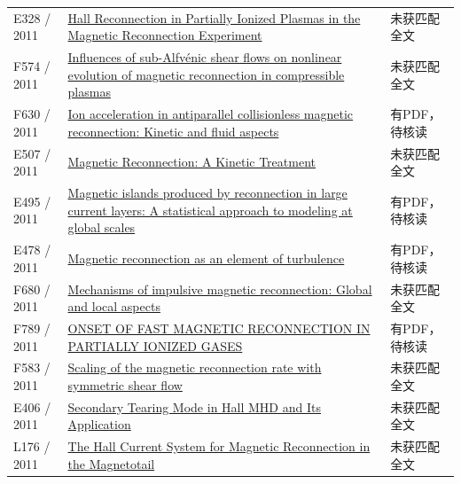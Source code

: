 \begin{longtable}{P{24mm}P{97mm}P{27mm}}
E328 / 2011 & \href{http://ui.adsabs.harvard.edu/abs/2012decs.confE...2L/abstract}{Hall Reconnection in Partially Ionized Plasmas in the Magnetic Reconnection Experiment} & 未获匹配全文\\

F574 / 2011 & \href{https://doi.org/10.1063/1.3643792}{Influences of sub-Alfvénic shear flows on nonlinear evolution of magnetic reconnection in compressible plasmas} & 未获匹配全文\\

F630 / 2011 & \href{https://doi.org/10.1016/j.crhy.2010.11.004}{Ion acceleration in antiparallel collisionless magnetic reconnection: Kinetic and fluid aspects} & 有PDF，待核读\\

E507 / 2011 & \href{https://doi.org/10.1029/gm090p0155}{Magnetic Reconnection: A Kinetic Treatment} & 未获匹配全文\\

E495 / 2011 & \href{http://hdl.handle.net/1903/12005}{Magnetic islands produced by reconnection in large current layers: A statistical approach to modeling at global scales} & 有PDF，待核读\\

E478 / 2011 & \href{https://doi.org/10.5194/npg-18-675-2011}{Magnetic reconnection as an element of turbulence} & 有PDF，待核读\\

F680 / 2011 & \href{https://doi.org/10.1063/1.3658034}{Mechanisms of impulsive magnetic reconnection: Global and local aspects} & 未获匹配全文\\

F789 / 2011 & \href{https://doi.org/10.1088/0004-637x/739/2/72}{ONSET OF FAST MAGNETIC RECONNECTION IN PARTIALLY IONIZED GASES} & 有PDF，待核读\\

F583 / 2011 & \href{https://doi.org/10.1063/1.3609771}{Scaling of the magnetic reconnection rate with symmetric shear flow} & 未获匹配全文\\

E406 / 2011 & \href{http://ui.adsabs.harvard.edu/abs/2011AGUFMSM23B2046M/abstract}{Secondary Tearing Mode in Hall MHD and Its Application} & 未获匹配全文\\

L176 / 2011 & \href{https://doi.org/10.1029/156gm18}{The Hall Current System for Magnetic Reconnection in the Magnetotail} & 未获匹配全文\\


\end{longtable}
